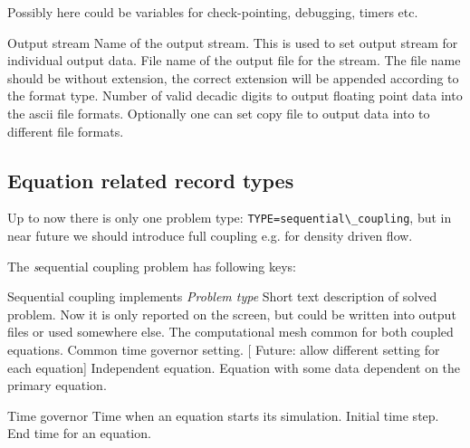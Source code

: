 \documentclass[12pt,a4paper]{report}
\begin{document}
Possibly here could be variables for check-pointing, debugging, timers etc.

\begin{recordtype}{Output stream}{}
  Name of the output stream. This is used to set output stream for 
  individual output data. 
  File name of the output file for the stream. The file name should be without extension, the correct extension
  will be appended according to the format type.
 Number of valid decadic digits to output floating point data into the ascii file formats.
 Optionally one can set copy file to output data into to different file formats.
\end{recordtype}


\subsection{Equation related record types}
Up to now there is only one problem type: \verb'TYPE=sequential\_coupling', 
but in near future we should introduce full coupling e.g. for density driven flow.

The {\emph sequential coupling problem} has following keys:
\begin{recordtype}{Sequential coupling}{ implements {\it Problem type} }
Short text description of solved problem. Now it is only reported on the screen, but could be 
written into output files or used somewhere else.
%
The computational mesh common for both coupled equations.
%
Common time governor  setting.
[ Future: allow different setting for each equation]
%
Independent equation.
%
Equation with some data dependent on the primary equation.
\end{recordtype}

\begin{recordtype}{Time governor}{}
Time when an equation starts its simulation.
Initial time step.
End time for an equation. 
\end{recordtype}
\end{document}
